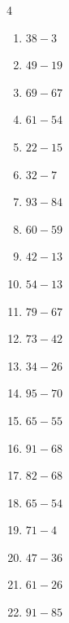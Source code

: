\begin{multicols}{4}
\begin{enumerate}
  \item $38-3$
        \phantom{$=35$}

  \item $49-19$
        \phantom{$=30$}

  \item $69-67$
        \phantom{$=2$}

  \item $61-54$
        \phantom{$=7$}

  \item $22-15$
        \phantom{$=7$}

  \item $32-7$
        \phantom{$=25$}

  \item $93-84$
        \phantom{$=9$}

  \item $60-59$
        \phantom{$=1$}

  \item $42-13$
        \phantom{$=29$}

  \item $54-13$
        \phantom{$=41$}

  \item $79-67$
        \phantom{$=12$}

  \item $73-42$
        \phantom{$=31$}

  \item $34-26$
        \phantom{$=8$}

  \item $95-70$
        \phantom{$=25$}

  \item $65-55$
        \phantom{$=10$}

  \item $91-68$
        \phantom{$=23$}

  \item $82-68$
        \phantom{$=14$}

  \item $65-54$
        \phantom{$=11$}

  \item $71-4$
        \phantom{$=67$}

  \item $47-36$
        \phantom{$=11$}

  \item $61-26$
        \phantom{$=35$}

  \item $91-85$
        \phantom{$=6$}


\end{enumerate}
\end{multicols}
